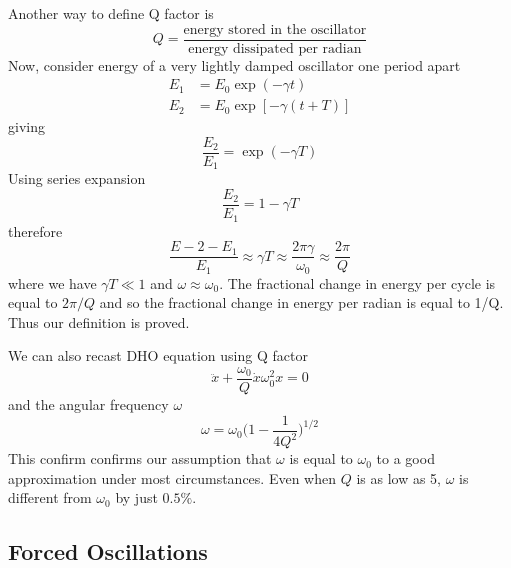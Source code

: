 \documentclass[../../main.tex]{subfiles}
\begin{document}
Another way to define Q factor is 
\begin{equation*}
    Q=\frac{\text{energy stored in the oscillator}}{\text{energy dissipated per radian}}
\end{equation*}
Now, consider energy of a very lightly damped oscillator one period apart 
\begin{align*}
    E_1&=E_0\exp(-\gamma t) \\
    E_2&=E_0\exp[-\gamma (t+T)]
\end{align*}
giving
\begin{equation*}
    \frac{E_2}{E_1}=\exp(-\gamma T)
\end{equation*}
Using series expansion
\begin{equation*}
    \frac{E_2}{E_1}=1-\gamma T
\end{equation*}
therefore
\begin{equation*}
    \frac{E-2-E_1}{E_1}\approx\gamma T\approx\frac{2\pi\gamma}{\omega_0}\approx\frac{2\pi}{Q}
\end{equation*}
where we have $\gamma T\ll 1$ and $\omega\approx\omega_0$. The fractional change in energy per cycle is equal to $2\pi/Q$ and so the fractional change in energy per radian is equal to 1/Q. Thus our definition is proved.

We can also recast DHO equation using Q factor
\begin{equation*}
    \ddot{x}+\frac{\omega_0}{Q}\dot{x}\omega_0^2x=0
\end{equation*}
and the angular frequency $\omega$
\begin{equation*}
    \omega =\omega_0\biggl(1-\frac{1}{4Q^2}\biggr)^{1/2}
\end{equation*}
This confirm confirms our assumption that $\omega$ is equal to $\omega_0$ to a good approximation under most circumstances. Even when $Q$ is as low as 5, $\omega$ is different from $\omega_0$ by just $0.5\%$.

\subsection{Forced Oscillations}
\end{document}
